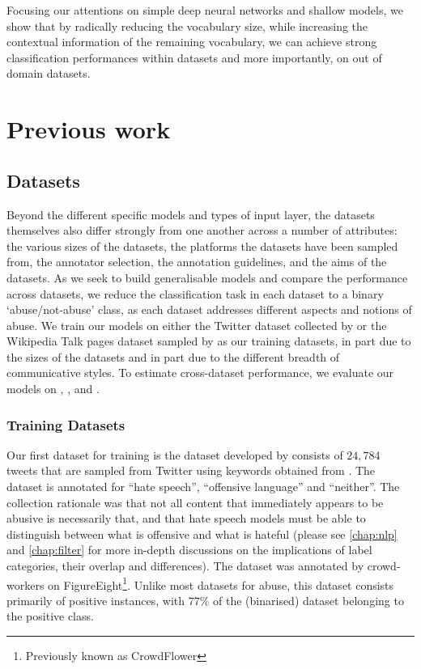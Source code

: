 Focusing our attentions on simple deep neural networks and shallow models, we show that by radically reducing the vocabulary size, while increasing the contextual information of the remaining vocabulary, we can achieve strong classification performances within datasets and more importantly, on out of domain datasets.

\section{Previous work}


\subsection{Datasets}
Beyond the different specific models and types of input layer, the datasets themselves also differ strongly from one another across a number of attributes: the various sizes of the datasets, the platforms the datasets have been sampled from, the annotator selection, the annotation guidelines, and the aims of the datasets. As we seek to build generalisable models and compare the performance across datasets, we reduce the classification task in each dataset to a binary `abuse/not-abuse' class, as each dataset addresses different aspects and notions of abuse.
We train our models on either the Twitter dataset collected by \citet{Davidson:2017} or the Wikipedia Talk pages dataset sampled by \citet{Wulczyn:2017} as our training datasets, in part due to the sizes of the datasets and in part due to the different breadth of communicative styles. To estimate cross-dataset performance, we evaluate our models on \citet{Waseem-Hovy:2016}, \citet{Waseem:2016}, and \citet{Garcia:2019}.


\subsubsection{Training Datasets}
Our first dataset for training is the dataset developed by \citet{Davidson:2017} consists of $24,784$ tweets that are sampled from Twitter using keywords obtained from \citet{Hatebase}. The dataset is annotated for ``hate speech'', ``offensive language'' and ``neither''. The collection rationale was that not all content that immediately appears to be abusive is necessarily that, and that hate speech models must be able to distinguish between what is offensive and what is hateful \cite{Davidson:2017} (please see \autoref{chap:nlp} and \autoref{chap:filter} for more in-depth discussions on the implications of label categories, their overlap and differences). The dataset was annotated by crowd-workers on FigureEight\footnote{Previously known as CrowdFlower}. Unlike most datasets for abuse, this dataset consists primarily of positive instances, with $77$\% of the (binarised) dataset belonging to the positive class.

